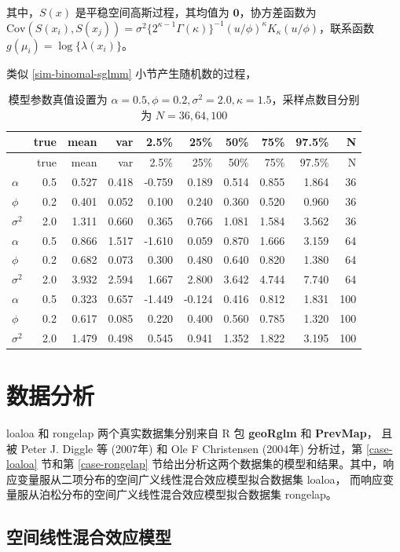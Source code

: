 \documentclass[12pt,a4paper,UTF8,twoside]{book}
\theoremstyle{definition}
\theoremstyle{definition}
\theoremstyle{definition}
\theoremstyle{remark}
\begin{document}
\noindent 其中，\(S(x)\) 是平稳空间高斯过程，其均值为
\(\mathbf{0}\)，协方差函数为
\(\mathrm{Cov}(S(x_i),S(x_j)) = \sigma^2 \big\{2^{\kappa-1}\Gamma(\kappa)\big\}^{-1}(u/\phi)^{\kappa}K_{\kappa}(u/\phi)\)，联系函数
\(g(\mu_i) = \log\{\lambda(x_{i})\}\)。

类似 \ref{sim-binomal-sglmm} 小节产生随机数的过程，

\begin{longtable}[]{@{}lrrrrrrrrr@{}}
\caption{\label{tab:Pois-MCLV-vs-NUTS} 模型参数真值设置为
\(\alpha = 0.5, \phi = 0.2, \sigma^2 = 2.0, \kappa = 1.5\)，采样点数目分别为
\(N=36,64,100\)}\tabularnewline
\toprule
& true & mean & var & 2.5\% & 25\% & 50\% & 75\% & 97.5\% &
N\tabularnewline
\midrule
\endfirsthead
\toprule
& true & mean & var & 2.5\% & 25\% & 50\% & 75\% & 97.5\% &
N\tabularnewline
\midrule
\endhead
\(\alpha\) & 0.5 & 0.527 & 0.418 & -0.759 & 0.189 & 0.514 & 0.855 &
1.864 & 36\tabularnewline
\(\phi\) & 0.2 & 0.401 & 0.052 & 0.100 & 0.240 & 0.360 & 0.520 & 0.960 &
36\tabularnewline
\(\sigma^2\) & 2.0 & 1.311 & 0.660 & 0.365 & 0.766 & 1.081 & 1.584 &
3.562 & 36\tabularnewline
\(\alpha\) & 0.5 & 0.866 & 1.517 & -1.610 & 0.059 & 0.870 & 1.666 &
3.159 & 64\tabularnewline
\(\phi\) & 0.2 & 0.682 & 0.073 & 0.300 & 0.480 & 0.640 & 0.820 & 1.380 &
64\tabularnewline
\(\sigma^2\) & 2.0 & 3.932 & 2.594 & 1.667 & 2.800 & 3.642 & 4.744 &
7.740 & 64\tabularnewline
\(\alpha\) & 0.5 & 0.323 & 0.657 & -1.449 & -0.124 & 0.416 & 0.812 &
1.831 & 100\tabularnewline
\(\phi\) & 0.2 & 0.617 & 0.085 & 0.220 & 0.400 & 0.560 & 0.785 & 1.320 &
100\tabularnewline
\(\sigma^2\) & 2.0 & 1.479 & 0.498 & 0.545 & 0.941 & 1.352 & 1.822 &
3.195 & 100\tabularnewline
\bottomrule
\end{longtable}

\hypertarget{applications}{%
\chapter{数据分析}\label{applications}}

loaloa 和 rongelap 两个真实数据集分别来自 R 包 \textbf{geoRglm} 和
\textbf{PrevMap}， 且被 Peter J. Diggle 等 (2007年)
\citep{Diggle2007ATMP} 和 Ole F Christensen (2004年)
\citep{Christensen2004} 分析过，第 \ref{case-loaloa} 节和第
\ref{case-rongelap}
节给出分析这两个数据集的模型和结果。其中，响应变量服从二项分布的空间广义线性混合效应模型拟合数据集
loaloa， 而响应变量服从泊松分布的空间广义线性混合效应模型拟合数据集
rongelap。

\hypertarget{sptial-random-effects}{%
\section{空间线性混合效应模型}\label{sptial-random-effects}}
\end{document}
